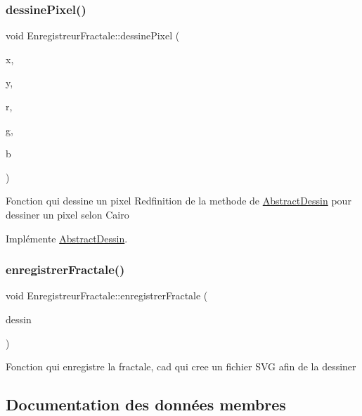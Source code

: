 \subsubsection{\texorpdfstring{dessine\+Pixel()}{dessinePixel()}}
{\footnotesize\ttfamily void Enregistreur\+Fractale\+::dessine\+Pixel (\begin{DoxyParamCaption}\item[{double}]{x,  }\item[{double}]{y,  }\item[{double}]{r,  }\item[{double}]{g,  }\item[{double}]{b }\end{DoxyParamCaption})\hspace{0.3cm}{\ttfamily [virtual]}}

Fonction qui dessine un pixel Redfinition de la methode de \hyperlink{classAbstractDessin}{Abstract\+Dessin} pour dessiner un pixel selon Cairo 

Implémente \hyperlink{classAbstractDessin_a82983d17a63c236c5ca8f4966195ffe3}{Abstract\+Dessin}.

\mbox{\label{classEnregistreurFractale_aa6ad605b775a79d8ea96a5bc8008070a}} 
\subsubsection{\texorpdfstring{enregistrer\+Fractale()}{enregistrerFractale()}}
{\footnotesize\ttfamily void Enregistreur\+Fractale\+::enregistrer\+Fractale (\begin{DoxyParamCaption}\item[{\hyperlink{classDessinFractaleGL}{Dessin\+Fractale\+GL} \&}]{dessin }\end{DoxyParamCaption})}

Fonction qui enregistre la fractale, cad qui cree un fichier S\+VG afin de la dessiner 

\subsection{Documentation des données membres}
\mbox{\label{classEnregistreurFractale_ad7af9f1a310fa61fca30232e655a08cb}} 
